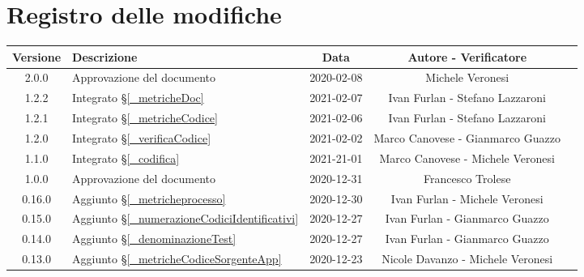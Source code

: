\section*{Registro delle modifiche}

\begin{center}
	\begin{longtable}{|c|p{5cm}|c|c|c|}
		\hline
		\rowcolor{lighter-grayer}
		\textbf{Versione} & \textbf{Descrizione} & \textbf{Data} & \textbf{Autore - Verificatore} \\
		\hline
		\endfirsthead

		2.0.0 & Approvazione del documento & 2020-02-08 & Michele Veronesi \\
		1.2.2 & Integrato \S\ref{_metricheDoc} & 2021-02-07 & Ivan Furlan - Stefano Lazzaroni \\
		1.2.1 & Integrato \S\ref{_metricheCodice} & 2021-02-06 & Ivan Furlan - Stefano Lazzaroni \\
		1.2.0 & Integrato \S\ref{_verificaCodice} & 2021-02-02 & Marco Canovese - Gianmarco Guazzo \\
		1.1.0 & Integrato \S\ref{_codifica} & 2021-21-01 & Marco Canovese - Michele Veronesi \\
		1.0.0 & Approvazione del documento & 2020-12-31 & Francesco Trolese \\
		0.16.0 & Aggiunto \S\ref{_metricheprocesso} & 2020-12-30 & Ivan Furlan - Michele Veronesi \\
		0.15.0 & Aggiunto \S\ref{_numerazioneCodiciIdentificativi} & 2020-12-27 & Ivan Furlan - Gianmarco Guazzo \\
		0.14.0 & Aggiunto \S\ref{_denominazioneTest} & 2020-12-27 & Ivan Furlan - Gianmarco Guazzo  \\
		0.13.0 & %
		Aggiunto \S\ref{_metricheCodiceSorgenteApp} & 2020-12-23 & Nicole Davanzo - Michele Veronesi  \\
		


\end{longtable}
\end{center}
